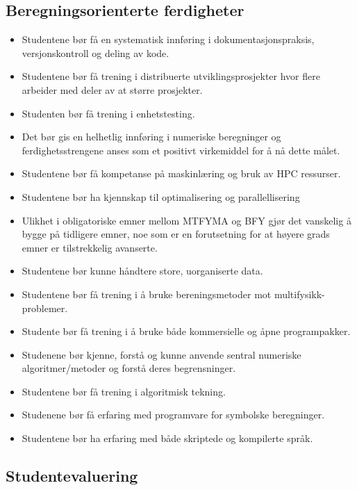 \subsection{Beregningsorienterte ferdigheter}

\begin{itemize}
	\item Studentene bør få en systematisk innføring i dokumentasjonspraksis, versjonskontroll og deling av kode.
	\item Studentene bør få trening i distribuerte utviklingsprosjekter hvor flere arbeider med deler av at større prosjekter.
	\item Studenten bør få trening i enhetstesting.
	\item Det bør gis en helhetlig innføring i numeriske beregninger og ferdighetsstrengene anses som et positivt virkemiddel for å nå dette målet.
	\item Studentene bør få kompetanse på maskinlæring og bruk av HPC ressurser.
	\item Studentene bør ha kjennskap til optimalisering og parallellisering
	\item Ulikhet i obligatoriske emner mellom MTFYMA og BFY gjør det vanskelig å bygge på tidligere emner, noe som er en forutsetning for at høyere grads emner er tilstrekkelig avanserte.
	\item Studentene bør kunne håndtere store, uorganiserte data.
	\item Studentene bør få trening i å bruke bereningsmetoder mot multifysikk-problemer.
	\item Studente bør få trening i å bruke både kommersielle og åpne programpakker.
	\item Studenene bør kjenne, forstå og kunne anvende sentral numeriske algoritmer/metoder og forstå deres begrensninger. 
	\item Studentene bør få trening i algoritmisk tekning.
	\item Studenene bør få erfaring med programvare for symbolske beregninger.
	\item Studentene bør ha erfaring med både skriptede og kompilerte språk.
\end{itemize}

\subsection{Studentevaluering}


